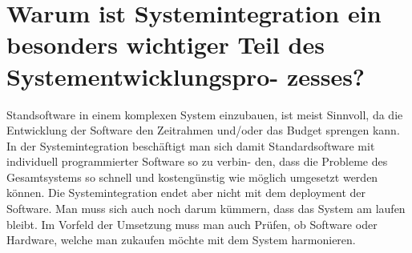 \documentclass[12pt]{article}
\begin{document}
\section{Warum ist Systemintegration ein besonders wichtiger Teil des Systementwicklungspro- zesses?}
Standsoftware in einem komplexen System einzubauen, ist meist Sinnvoll, da die Entwicklung der Software den Zeitrahmen und/oder das Budget sprengen kann. In der Systemintegration beschäftigt man sich damit Standardsoftware mit individuell programmierter Software so zu verbin- den, dass die Probleme des Gesamtsystems so schnell und kostengünstig wie möglich umgesetzt werden können. Die Systemintegration endet aber nicht mit dem deployment der Software. Man muss sich auch noch darum kümmern, dass das System am laufen bleibt. Im Vorfeld der Umsetzung muss man auch Prüfen, ob Software oder Hardware, welche man zukaufen möchte mit dem System harmonieren.
\pagebreak
\end{document}
